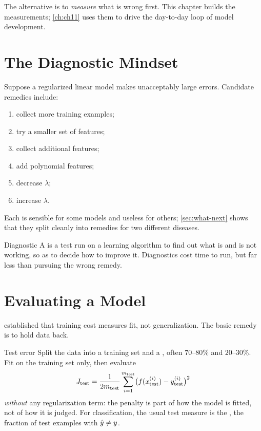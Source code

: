 The alternative is to \emph{measure} what is wrong first. This chapter builds the
measurements; \cref{ch:ch11} uses them to drive the day-to-day loop of model
development.

\section{The Diagnostic Mindset}
\label{sec:diagnostic}

Suppose a regularized linear model makes unacceptably large errors. Candidate
remedies include:

\begin{enumerate}
  \item collect more training examples;
  \item try a smaller set of features;
  \item collect additional features;
  \item add polynomial features;
  \item decrease $\lambda$;
  \item increase $\lambda$.
\end{enumerate}

Each is sensible for some models and useless for others; \cref{sec:what-next}
shows that they split cleanly into remedies for two different diseases.

\begin{defbox}{Diagnostic}
A  is a test run on a learning algorithm to find out what is
and is not working, so as to decide how to improve it. Diagnostics cost time to
run, but far less than pursuing the wrong remedy.
\end{defbox}

\section{Evaluating a Model}
\label{sec:evaluating}

 established that training cost measures fit, not
generalization. The basic remedy is to hold data back.

\begin{defbox}{Test error}
Split the data into a training set and a , often $70$--$80\%$ and
$20$--$30\%$. Fit on the training set only, then evaluate
\[
  J_{\text{test}} = \frac{1}{2m_{\text{test}}}\sum_{i=1}^{m_{\text{test}}}
     \bigl(f(x^{(i)}_{\text{test}}) - y^{(i)}_{\text{test}}\bigr)^2
\]
\emph{without} any regularization term: the penalty is part of how the model is
fitted, not of how it is judged. For classification, the usual test measure is
the , the fraction of test examples with
$\hat{y} \ne y$.
\end{defbox}

